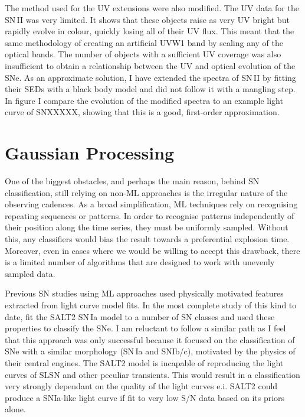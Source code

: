 The method used for the UV extensions were also modified. The UV data for the SN\,II was very limited. It shows that these objects raise as very UV bright but rapidly evolve in colour, quickly losing all of their UV flux. This meant that the same methodology of creating an artificial UVW1 band by scaling any of the optical bands. The number of objects with a sufficient UV coverage was also insufficient to obtain a relationship between the UV and optical evolution of the SNe. As an approximate solution, I have extended the spectra of SN\,II by fitting their SEDs with a black body model and did not follow it with a mangling step. In figure  I compare the evolution of the modified spectra to an example light curve of SNXXXXX, showing that this is a good, first-order approximation.

\begin{figure}
  \caption{}
  \label{fig:SNIIbbExtension}
\end{figure}

\section{Gaussian Processing} \label{sec:GP}
One of the biggest obstacles, and perhaps the main reason, behind SN classification, still relying on non-ML approaches is the irregular nature of the observing cadences. As a broad simplification, ML techniques rely on recognising repeating sequences or patterns. In order to recognise patterns independently of their position along the time series, they must be uniformly sampled. Without this, any classifiers would bias the result towards a preferential explosion time. Moreover, even in cases where we would be willing to accept this drawback, there is a limited number of algorithms that are designed to work with unevenly sampled data.

Previous SN studies using ML approaches used physically motivated features extracted from light curve model fits. In the most complete study of this kind to date, \citet{Lochner2016} fit the SALT2 SN\,Ia model to a number of SN classes and used these properties to classify the SNe. I am reluctant to follow a similar path as I feel that this approach was only successful because it focused on the classification of SNe with a similar morphology (SN\,Ia and SNIb/c), motivated by the physics of their central engines. The SALT2 model is incapable of reproducing the light curves of SLSN and other peculiar transients. This would result in a classification very strongly dependant on the quality of the light curves e.i. SALT2 could produce a SNIa-like light curve if fit to very low S/N data based on its priors alone.

